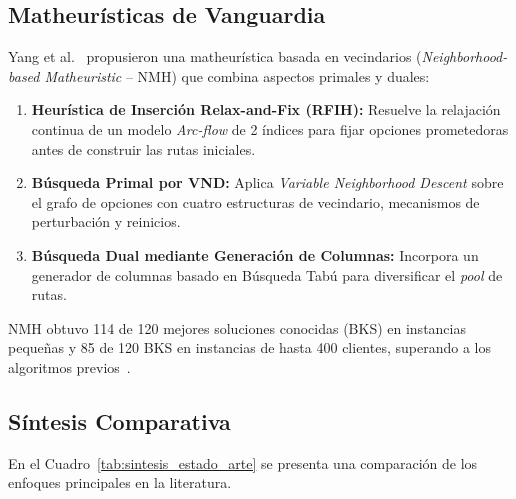 \documentclass[letter, 10pt]{article}
\begin{document}
\subsection{Matheurísticas de Vanguardia} 

Yang et al.~\cite{Yang25Neighborhood} propusieron una matheurística basada en vecindarios (\emph{Neighborhood-based Matheuristic} -- NMH) que combina aspectos primales y duales: \begin{enumerate} \item \textbf{Heurística de Inserción Relax-and-Fix (RFIH):} Resuelve la relajación continua de un modelo \emph{Arc-flow} de 2 índices para fijar opciones prometedoras antes de construir las rutas iniciales. \item \textbf{Búsqueda Primal por VND:} Aplica \emph{Variable Neighborhood Descent} sobre el grafo de opciones con cuatro estructuras de vecindario, mecanismos de perturbación y reinicios. \item \textbf{Búsqueda Dual mediante Generación de Columnas:} Incorpora un generador de columnas basado en Búsqueda Tabú para diversificar el \emph{pool} de rutas. \end{enumerate} NMH obtuvo 114 de 120 mejores soluciones conocidas (BKS) en instancias pequeñas y 85 de 120 BKS en instancias de hasta 400 clientes, superando a los algoritmos previos~\cite{Yang25Neighborhood}. \subsection{Síntesis Comparativa} En el Cuadro~\ref{tab:sintesis_estado_arte} se presenta una comparación de los enfoques principales en la literatura. 
\end{document}
